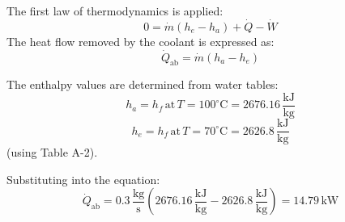 The first law of thermodynamics is applied:  
\[
0 = \dot{m} (h_e - h_a) + \dot{Q} - \dot{W}
\]  
The heat flow removed by the coolant is expressed as:  
\[
\dot{Q}_{\text{ab}} = \dot{m} (h_a - h_e)
\]  

The enthalpy values are determined from water tables:  
\[
h_a = h_f \, \text{at} \, T = 100^\circ\text{C} = 2676.16 \, \frac{\text{kJ}}{\text{kg}}
\]  
\[
h_e = h_f \, \text{at} \, T = 70^\circ\text{C} = 2626.8 \, \frac{\text{kJ}}{\text{kg}}
\]  
(using Table A-2).  

Substituting into the equation:  
\[
\dot{Q}_{\text{ab}} = 0.3 \, \frac{\text{kg}}{\text{s}} \left( 2676.16 \, \frac{\text{kJ}}{\text{kg}} - 2626.8 \, \frac{\text{kJ}}{\text{kg}} \right) = 14.79 \, \text{kW}
\]